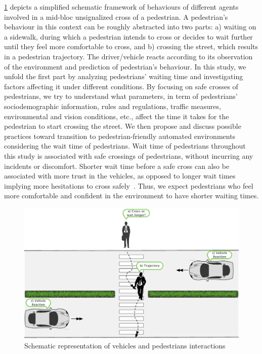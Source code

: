\cref{fig:interaction} depicts a simplified schematic framework of behaviours of different agents involved in a mid-bloc unsignalized cross of a pedestrian. A pedestrian's behaviour in this context can be roughly abstracted into two parts: a) waiting on a sidewalk, during which a pedestrian intends to cross or decides to wait further until they feel more comfortable to cross, and b) crossing the street, which results in a pedestrian trajectory. The driver/vehicle reacts according to its observation of the environment and prediction of pedestrian's behaviour. In this study, we unfold the first part by analyzing pedestrians' waiting time and investigating factors affecting it under different conditions. By focusing on safe crosses of pedestrians, we try to understand what parameters, in term of pedestrians' sociodemographic information, rules and regulations, traffic measures, environmental and vision conditions, etc., affect the time it takes for the pedestrian to start crossing the street. We then propose and discuss possible practices toward transition to pedestrian-friendly automated environments considering the wait time of pedestrians. Wait time of pedestrians throughout this study is associated with safe crossings of pedestrians, without incurring any incidents or discomfort. Shorter wait time before a safe cross can also be associated with more trust in the vehicles, as opposed to longer wait times implying more hesitations to cross safely~\citep{jayaraman2019pedestrian}. Thus, we expect pedestrians who feel more comfortable and confident in the environment to have shorter waiting times.
\begin{figure}
    \centering
    \includegraphics[scale=0.7]{chapter_4/figures/cross.pdf}
    \caption{Schematic representation of vehicles and pedestrians interactions}
    \label{fig:interaction}
\end{figure}

